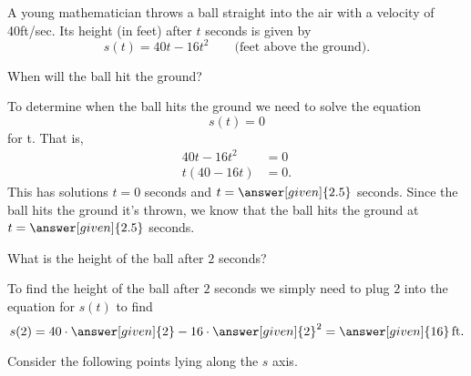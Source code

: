 \documentclass{ximera}
\begin{document}
\begin{example}
A young mathematician throws a ball straight into the air with 
a velocity of 40ft/sec. Its height (in feet) after $t$ seconds 
is given by
\[
s(t) = 40t-16t^2 \qquad\text{(feet above the ground)} .
\]

When will the ball hit the ground?

\begin{explanation}
To determine when the ball hits the ground we need to solve the
equation
\[
s(t)=0
\]
for t.  That is,
\begin{align*}
40t-16t^2 &= 0\\
t(40-16t) &= 0.
\end{align*}
This has solutions $t=0$
seconds and $t=\answer[given]{2.5}$ seconds.  Since the ball hits
the ground  it's
thrown, we know that the ball hits the ground at $t=\answer[given]{2.5}$
seconds.
\end{explanation}

What is the height of the ball after $2$ seconds?

\begin{explanation}
To find the height of the ball after $2$ seconds we simply need 
to plug $2$ into the equation for $s(t)$ to find
\[
s(2) = 40\cdot\answer[given]{2} - 16\cdot\answer[given]{2}^2 = 
\answer[given]{16}\unit{ft.}
\]

\end{explanation}

Consider the following points lying along the $s$ axis.
\begin{image}
\end{image}
\end{example}
\end{document}
